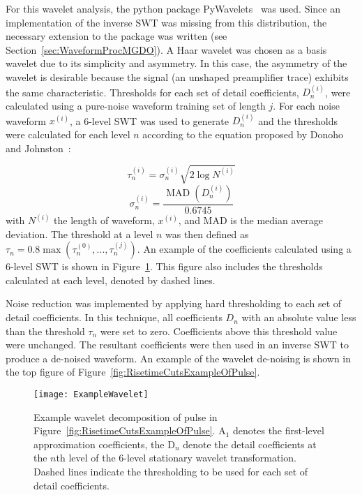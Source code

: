 	For this wavelet analysis, the python package PyWavelets~\cite{PyWave} was used.  Since an implementation of the inverse SWT was missing from this distribution, the necessary extension to the package was written (see Section~\ref{sec:WaveformProcMGDO}).  A Haar wavelet was chosen as a basis wavelet due to its simplicity and asymmetry.  In this case, the asymmetry of the wavelet is desirable because the signal (an unshaped preamplifier trace) exhibits the same characteristic.  Thresholds for each set of detail coefficients, $D_{n}^{(i)}$, were calculated using a pure-noise waveform training set of length $j$.  For each noise waveform $x^{(i)}$, a 6-level SWT was used to generate $D_{n}^{(i)}$ and the thresholds were calculated for each level $n$ according to the equation proposed by Donoho and Johnston~\cite{Don95ad}:
	
				\begin{equation}			
					\tau_{n}^{(i)} = \sigma_{n}^{(i)} \sqrt{2 \log N^{(i)}}
				\end{equation}			
				\[
					\sigma_{n}^{(i)} = \frac{\operatorname{MAD}\left(D_{n}^{(i)}\right)}{0.6745}
				\]
with $N^{(i)}$ the length of waveform, $x^{(i)}$, and MAD is the median average deviation.  The threshold at a level $n$ was then defined as $\tau_{n} = 0.8 \max(\tau_{n}^{(0)},...,\tau_{n}^{(j)})$.  An example of the coefficients calculated using a 6-level SWT is shown in Figure~\ref{fig:RisetimeCutsWaveletDecompositionOfPulse}.  This figure also includes the thresholds calculated at each level, denoted by dashed lines.  

Noise reduction was implemented by applying hard thresholding to each set of detail coefficients.  In this technique, all coefficients $D_{n}$ with an absolute value less than the threshold $\tau_{n}$ were set to zero.  Coefficients above this threshold value were unchanged.  The resultant coefficients were then used in an inverse SWT to produce a de-noised waveform.  An example of the wavelet de-noising is shown in the top figure of Figure~\ref{fig:RisetimeCutsExampleOfPulse}.
	
			
				\begin{figure}
					\centering
					\texttt{[image: ExampleWavelet]}
					\caption[Example wavelet decomposition of pulse]
					{Example wavelet decomposition of pulse in Figure~\ref{fig:RisetimeCutsExampleOfPulse}.  
					A$_{1}$ denotes the first-level
					 approximation coefficients, the D$_{n}$ denote the detail coefficients at the $n$th level of the 6-level stationary wavelet 
					 transformation.  Dashed lines indicate the thresholding to be used for each set of detail coefficients.}
					\label{fig:RisetimeCutsWaveletDecompositionOfPulse}
				\end{figure}					

